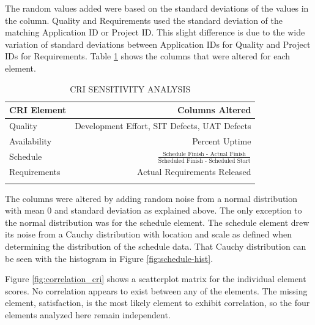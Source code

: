 \documentclass[SDSUThesis.tex]{subfiles}
\begin{document}
        The random values added were based on the standard 
        deviations of the values in the column.
        Quality and Requirements used the standard deviation of the
        matching Application ID or Project ID.  This slight difference
        is due to the wide variation of standard deviations between
        Application IDs for Quality and Project IDs for Requirements. 
        Table \ref{tab:sensitivity} shows the columns that were
        altered for each element.  
        
        \begin{longtable}{@{}l r}
            \toprule%
             \centering%
             {\bfseries CRI Element}
             & {\bfseries Columns Altered } \\
            
            \cmidrule[0.2pt](r{0.125em}){1-1}%
            \cmidrule[0.2pt](r{0.125em}){2-2}%
            \endhead
            
            Quality  & Development Effort, SIT Defects, UAT Defects \\
            \myrowcolour%
            Availability & Percent Uptime \\
            Schedule &  $\frac{\text{Schedule Finish - Actual Finish}}
                    {\text{Scheduled Finish - Scheduled Start}}$ \\
            \myrowcolour%
            Requirements & Actual Requirements Released \\
            
            \bottomrule
            
            \caption{CRI SENSITIVITY ANALYSIS}
            \label{tab:sensitivity}
        \end{longtable}
        
        The columns were altered by adding
        random noise from a normal distribution with mean 0 and standard
        deviation as explained above.  The only exception to the normal
        distribution was for the schedule element.  The schedule element
        drew its noise from a Cauchy distribution with location and scale
        as defined when determining the distribution of the schedule data.
        That Cauchy distribution can be seen with the histogram in 
        Figure \ref{fig:schedule-hist}. 
        
        Figure \ref{fig:correlation_cri} shows a scatterplot matrix
        for the individual element scores.  No correlation appears
        to exist between any of the elements. The missing element,
        satisfaction, is the most likely element to exhibit correlation,
        so the four elements analyzed here remain independent.
        
\end{document}
